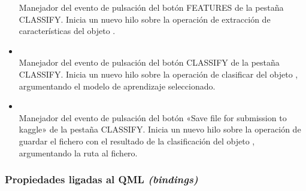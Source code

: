 \begin{itemize}
Manejador del evento de pulsación del botón FEATURES de la pestaña CLASSIFY. Inicia un nuevo hilo sobre la operación de extracción de características del objeto .
\item {}\\
Manejador del evento de pulsación del botón CLASSIFY de la pestaña CLASSIFY. Inicia un nuevo hilo sobre la operación de clasificar del objeto , argumentando el modelo de aprendizaje seleccionado.
\item {}\\
Manejador del evento de pulsación del botón «Save file for submission to kaggle» de la pestaña CLASSIFY. Inicia un nuevo hilo sobre la operación de guardar el fichero con el resultado de la clasificación del objeto , argumentando la ruta al fichero.
\end{itemize}

\subsubsection{Propiedades ligadas al QML \emph{(bindings)}}


